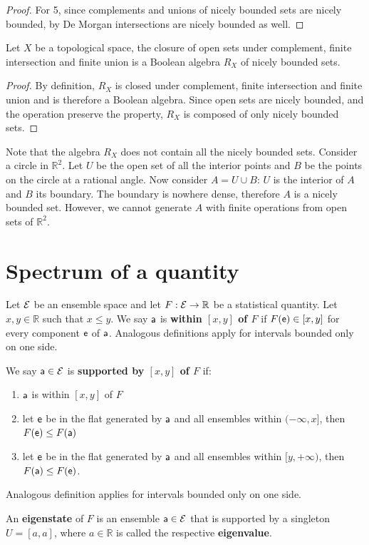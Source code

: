 \begin{mathSection}
\begin{proof}
		For 5, since complements and unions of nicely bounded sets are nicely bounded, by De Morgan intersections are nicely bounded as well.
	\end{proof}
	
	\begin{prop}
		Let $X$ be a topological space, the closure of open sets under complement, finite intersection and finite union is a Boolean algebra $R_X$ of nicely bounded sets.
	\end{prop}
	
	\begin{proof}
		By definition, $R_X$ is closed under complement, finite intersection and finite union and is therefore a Boolean algebra. Since open sets are nicely bounded, and the operation preserve the property, $R_X$ is composed of only nicely bounded sets.
	\end{proof}
	
	\begin{remark}
		Note that the algebra $R_X$ does not contain all the nicely bounded sets. Consider a circle in $\mathbb{R}^2$. Let $U$ be the open set of all the interior points and $B$ be the points on the circle at a rational angle. Now consider $A = U \cup B$: $U$ is the interior of $A$ and $B$ its boundary. The boundary is nowhere dense, therefore $A$ is a nicely bounded set. However, we cannot generate $A$ with finite operations from open sets of $\mathbb{R}^2$.
	\end{remark}
\end{mathSection}


\section{Spectrum of a quantity}

\begin{defn}
	Let $\Ens$ be an ensemble space and let $F : \Ens \to \mathbb{R}$ be a statistical quantity. Let $x,y \in \mathbb{R}$ such that $x \leq y$. We say $\ens[a]$ is \textbf{within $[x,y]$ of $F$} if $F(\ens) \in [x,y]$ for every component $\ens$ of $\ens[a]$. Analogous definitions apply for intervals bounded only on one side.
	
	We say $\ens[a] \in \Ens$ is \textbf{supported by $[x,y]$ of $F$} if:
	\begin{enumerate}
		\item $\ens[a]$ is within $[x,y]$ of $F$
		\item let $\ens$ be in the flat generated by $\ens[a]$ and all ensembles within $(-\infty,x]$, then $F(\ens) \leq F(\ens[a])$
		\item let $\ens$ be in the flat generated by $\ens[a]$ and all ensembles within $[y, +\infty)$, then $F(\ens[a]) \leq F(\ens)$.
	\end{enumerate}
	Analogous definition applies for intervals bounded only on one side.
	
	An \textbf{eigenstate} of $F$ is an ensemble $\ens[a] \in \Ens$ that is supported by a singleton $U=[a,a]$, where $a \in \mathbb{R}$ is called the respective \textbf{eigenvalue}. 
\end{defn}

